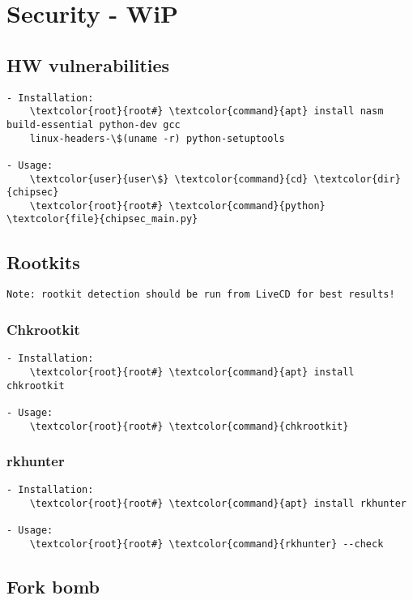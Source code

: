 \documentclass[10pt, a4paper, onecolumn, openany]{book} %
\begin{document}
\chapter{Security - WiP}
\section{HW vulnerabilities}
\begin{Verbatim}[commandchars=\\\{\}]
- Installation:
    \textcolor{root}{root#} \textcolor{command}{apt} install nasm build-essential python-dev gcc 
    linux-headers-\$(uname -r) python-setuptools
    
- Usage: 
    \textcolor{user}{user\$} \textcolor{command}{cd} \textcolor{dir}{chipsec}
    \textcolor{root}{root#} \textcolor{command}{python} \textcolor{file}{chipsec_main.py}
\end{Verbatim}
\section{Rootkits}
\begin{Verbatim}[commandchars=\\\{\}]
Note: rootkit detection should be run from LiveCD for best results!
\end{Verbatim}
\subsection{Chkrootkit}
\begin{Verbatim}[commandchars=\\\{\}]
- Installation:
    \textcolor{root}{root#} \textcolor{command}{apt} install chkrootkit

- Usage:
    \textcolor{root}{root#} \textcolor{command}{chkrootkit}
\end{Verbatim}
\subsection{rkhunter}
\begin{Verbatim}[commandchars=\\\{\}]
- Installation:
    \textcolor{root}{root#} \textcolor{command}{apt} install rkhunter

- Usage:
    \textcolor{root}{root#} \textcolor{command}{rkhunter} --check
\end{Verbatim}

\section{Fork bomb}
\end{document}
